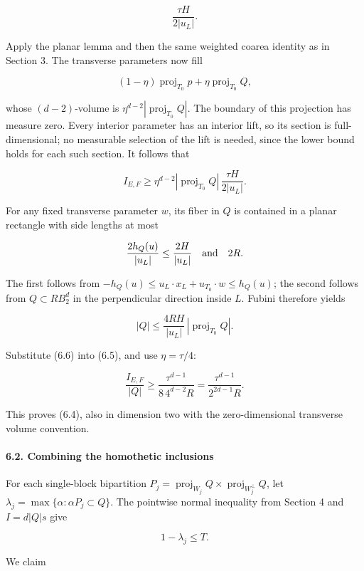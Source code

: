 \documentclass[
  11pt,
]{article}
\begin{document}
\[
\frac{\tau H}{2|u_L|}.
\]

Apply the planar lemma and then the same weighted coarea identity as in
Section 3. The transverse parameters now fill

\[
(1-\eta)\operatorname{proj}_{T_0}p+
       \eta\operatorname{proj}_{T_0}Q,
\]

whose \((d-2)\)-volume is \(\eta^{d-2}|\operatorname{proj}_{T_0}Q|\).
The boundary of this projection has measure zero. Every interior
parameter has an interior lift, so its section is full-dimensional; no
measurable selection of the lift is needed, since the lower bound holds
for each such section. It follows that

\[
I_{E,F}\ge
\eta^{d-2}|\operatorname{proj}_{T_0}Q|\,
       \frac{\tau H}{2|u_L|}.                        \tag{6.5}
\]

For any fixed transverse parameter \(w\), its fiber in \(Q\) is
contained in a planar rectangle with side lengths at most

\[
\frac{2h_Q(u)}{|u_L|}\le\frac{2H}{|u_L|}
\quad\hbox{and}\quad 2R.
\]

The first follows from
\(-h_Q(u)\le u_L\cdot x_L+u_{T_0}\cdot w\le h_Q(u)\); the second follows
from \(Q\subset RB_2^d\) in the perpendicular direction inside \(L\).
Fubini therefore yields

\[
|Q|\le\frac{4RH}{|u_L|}\,
          |\operatorname{proj}_{T_0}Q|.              \tag{6.6}
\]

Substitute (6.6) into (6.5), and use \(\eta=\tau/4\):

\[
\frac{I_{E,F}}{|Q|}
\ge\frac{\tau^{d-1}}{8\,4^{d-2}R}
 =\frac{\tau^{d-1}}{2^{2d-1}R}.
\]

This proves (6.4), also in dimension two with the zero-dimensional
transverse volume convention.

\paragraph{6.2. Combining the homothetic
inclusions}\label{combining-the-homothetic-inclusions}

For each single-block bipartition \(P_j=\operatorname{proj}_{W_j}Q\times
\operatorname{proj}_{W_j^\perp}Q\), let
\(\lambda_j=\max\{\alpha:\alpha P_j\subset Q\}\). The pointwise normal
inequality from Section 4 and \(I=d|Q|s\) give

\[
1-\lambda_j\le T.                                   \tag{6.7}
\]

We claim
\end{document}
